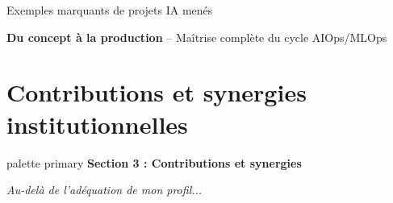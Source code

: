 \documentclass[aspectratio=169,11pt]{beamer}
\begin{document}
\begin{frame}{Exemples marquants de projets IA menés}
  \vspace{0.3em}
  \begin{alertblock}{}
    \centering
    \textbf{Du concept à la production} -- Maîtrise complète du cycle AIOps/MLOps
  \end{alertblock}
\end{frame}

\section{Contributions et synergies institutionnelles}

\begin{frame}{}
  \begin{beamercolorbox}[wd=\paperwidth,ht=1.8cm,dp=0.3cm,center]{palette primary}
    {\large\bfseries Section 3 : Contributions et synergies}
  \end{beamercolorbox}
  
  \vspace{1.5cm}
  
  \centering
  {\Large\textit{Au-delà de l'adéquation de mon profil...}}
  
  \vspace{1em}
  
  {\large{}}
  \vfill
\end{frame}
\end{document}
